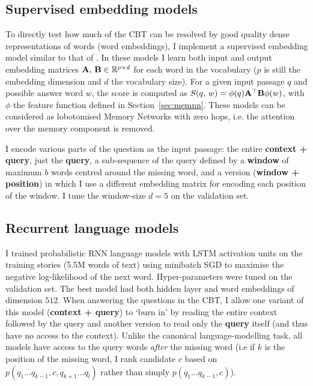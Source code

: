 \subsection{Supervised embedding models}
To directly test how much of the CBT can be resolved by good quality dense representations of words (word embeddings), I implement a supervised embedding model similar to that of \citep{weston2010large}. In these models I learn both input and output embedding matrices \({\bf A},\,{\bf B} \in \mathbb{R}^{p\times d}\) for each word in the vocabulary ($p$ is still the embedding dimension and $d$ the vocabulary size). For a given input passage \(q\) and possible answer word \(w\), the score is computed as \(S(q,\,w) = \phi(q) {\bf A} ^\top {\bf B} \phi(w) \), with \(\phi\) the feature function defined in Section~\ref{sec:memnn}.
These models can be considered as lobotomised Memory Networks with zero hops, 
i.e. the attention over the memory component is removed.

I encode various parts of the question as the input passage: the entire {\bf context + query}, just the {\bf query}, a sub-sequence of the query defined by a {\bf window} of maximum \(b\) words centred around the missing word, and a version ({\bf window + position}) in which I use a different embedding matrix  for encoding each position of the window. I tune the window-size \(d=5\) on the validation set. 


\subsection{Recurrent language models}
I trained probabilistic RNN language models with LSTM activation units on the training stories (5.5M words of text) using minibatch SGD to maximise the negative log-likelihood of the next word. Hyper-parameters were tuned on the validation set. The best model had both hidden layer and word embeddings of dimension $512$.
%
When answering the questions in the CBT, I allow one variant of this model ({\bf context + query}) to `burn in' by reading the entire context followed by the query and another version to read only the {\bf query} itself (and thus have no access to the context). Unlike the canonical language-modelling task, all models have access to the query words {\em after} the missing word (i.e if $k$ is the position of the missing word, I rank candidate \(c\) based on \(p(q_1 \dots q_{k-1}, c , q_{k+1} \dots q_l)\) rather than simply \(p(q_1 \dots q_{k-1},c)\)).

